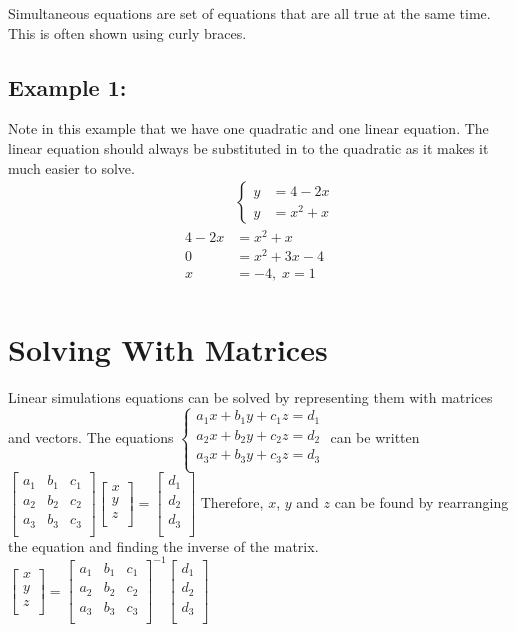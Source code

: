 \documentclass[class=article, crop=false]{standalone}
\begin{document}
Simultaneous equations are set of equations that are all true at the same time. This is often shown using curly braces.
\subsection*{Example 1:}
Note in this example that we have one quadratic and one linear equation. The linear equation should always be substituted in to the quadratic as it makes it much easier to solve. 
\begin{align*}
& 
\begin{cases}
y & = 4 - 2x \\
y & = x^2 + x 
\end{cases}
\\ 
4 - 2x & = x^2 + x 
\\
0 & = x^2 + 3x -4 
\\ 
x & = -4,\;x = 1
\\
\end{align*}
\section*{Solving With Matrices}
Linear simulations equations can be solved by representing them with matrices and vectors. The equations 
$\begin{cases}
a_1 x + b_1 y + c_1 z = d_1 \\
a_2 x + b_2 y + c_2 z = d_2 \\
a_3 x + b_3 y + c_3 z = d_3 \\
\end{cases}$
can be written 
$\begin{bmatrix}
a_1 & b_1 & c_1 \\
a_2 & b_2 & c_2 \\
a_3 & b_3 & c_3 \\
\end{bmatrix}
\begin{bmatrix}
x \\ y \\ z \\
\end{bmatrix} = 
\begin{bmatrix}
d_1 \\ d_2 \\ d_3 \\
\end{bmatrix}$
Therefore, $x$, $y$ and $z$ can be found by rearranging the equation and finding the inverse of the matrix. 
$\begin{bmatrix}
x \\ y \\ z \\
\end{bmatrix} = 
\begin{bmatrix}
a_1 & b_1 & c_1 \\
a_2 & b_2 & c_2 \\
a_3 & b_3 & c_3 \\
\end{bmatrix}^{-1}
\begin{bmatrix}
d_1 \\ d_2 \\ d_3 \\
\end{bmatrix}$
\end{document}
